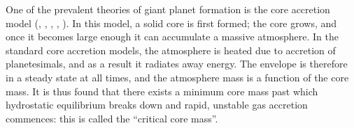 \documentclass[apj]{emulateapj}
\begin{document}
%
%

One of the prevalent theories of giant planet formation is the core accretion model  (\citealt{mizuno78}, \citealt{stevenson82}, \citealt{boden86}, \citealt{wuchterl93}, \citealt{dangelo11}). In this model, a solid core is first formed; the core grows, and once it becomes large enough it can accumulate a massive atmosphere. In the standard core accretion models, the atmosphere is heated due to accretion of planetesimals, and as a result it radiates away energy. The envelope is therefore in a steady state at all times, and the atmosphere mass is a function of the core mass. It is thus found that there exists a minimum core mass past which hydrostatic equilibrium breaks down and rapid, unstable gas accretion commences: this is called the ``critical core mass''.
\end{document}
